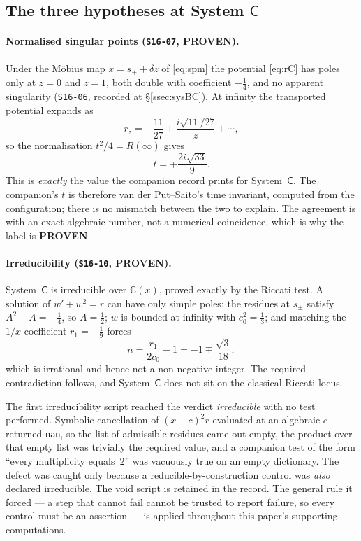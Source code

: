 \subsection{The three hypotheses at System \texorpdfstring{$\mathsf
C$}{C}}\label{ssec:hyp-check}

\paragraph{Normalised singular points (\texttt{S16-07}, \textbf{PROVEN}).}
Under the M\"obius map $x=s_++\delta z$ of \eqref{eq:spm} the potential
\eqref{eq:rC} has poles only at $z=0$ and $z=1$, both double with coefficient
$-\tfrac14$, and no apparent singularity (\texttt{S16-06}, recorded at
\S\ref{ssec:sysBC}). At infinity the transported potential expands as
\[
  r_z=-\frac{11}{27}+\frac{i\sqrt{11}/27}{z}+\cdots,
\]
so the normalisation $t^2/4=R(\infty)$ gives
\[
  t=\mp\frac{2i\sqrt{33}}{9}.
\]
This is \emph{exactly} the value the companion record prints for
System~$\mathsf C$. The companion's $t$ is therefore van der Put--Saito's time
invariant, computed from the configuration; there is no mismatch between the
two to explain. The agreement is with an exact algebraic number, not a
numerical coincidence, which is why the label is \textbf{PROVEN}.

\paragraph{Irreducibility (\texttt{S16-10}, \textbf{PROVEN}).}
System~$\mathsf C$ is irreducible over $\mathbb C(x)$, proved exactly by the
Riccati test. A solution of $w'+w^2=r$ can have only simple poles; the residues
at $s_\pm$ satisfy $A^2-A=-\tfrac14$, so $A=\tfrac12$; $w$ is bounded at
infinity with $c_0^2=\tfrac13$; and matching the $1/x$ coefficient
$r_1=-\tfrac19$ forces
\[
  n=\frac{r_1}{2c_0}-1=-1\mp\frac{\sqrt3}{18},
\]
which is irrational and hence not a non-negative integer. The required
contradiction follows, and System~$\mathsf C$ does not sit on the classical
Riccati locus.

\begin{remark}\label{rem:void}
The first irreducibility script reached the verdict \emph{irreducible} with no
test performed. Symbolic cancellation of $(x-c)^2r$ evaluated at an algebraic
$c$ returned \texttt{nan}, so the list of admissible residues came out empty,
the product over that empty list was trivially the required value, and a
companion test of the form ``every multiplicity equals~$2$'' was vacuously true
on an empty dictionary. The defect was caught only because a
reducible-by-construction control was \emph{also} declared irreducible. The
void script is retained in the record. The general rule it forced --- a step
that cannot fail cannot be trusted to report failure, so every control must be
an assertion --- is applied throughout this paper's supporting computations.
\end{remark}

